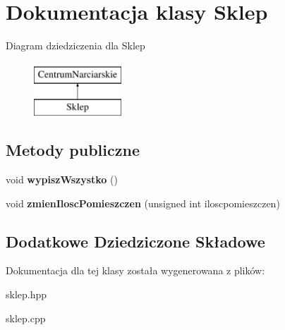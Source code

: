 \hypertarget{class_sklep}{}\section{Dokumentacja klasy Sklep}
\label{class_sklep}
Diagram dziedziczenia dla Sklep\begin{figure}[H]
\begin{center}
\leavevmode
\includegraphics[height=2.000000cm]{class_sklep}
\end{center}
\end{figure}
\subsection*{Metody publiczne}
\begin{DoxyCompactItemize}
\item 
\mbox{\label{class_sklep_a13a92e8796513fb8dcfaad878b55bb65}} 
void {\bfseries wypisz\+Wszystko} ()
\item 
\mbox{\label{class_sklep_a2a21b324f47f33722d0d3ce96c6e2084}} 
void {\bfseries zmien\+Ilosc\+Pomieszczen} (unsigned int iloscpomieszczen)
\end{DoxyCompactItemize}
\subsection*{Dodatkowe Dziedziczone Składowe}


Dokumentacja dla tej klasy została wygenerowana z plików\+:\begin{DoxyCompactItemize}
\item 
sklep.\+hpp\item 
sklep.\+cpp\end{DoxyCompactItemize}

